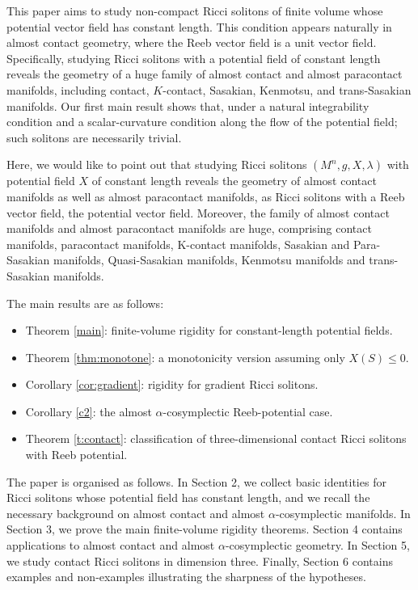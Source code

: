 \documentclass[a4paper, twoside, 10pt]{article}
\numberwithin{equation}{section}
\theoremstyle{definition}
\begin{document}
This paper aims to study non-compact Ricci solitons of finite volume whose potential vector field has constant length. This condition appears naturally in almost contact geometry, where the Reeb vector field is a unit vector field. Specifically, studying Ricci solitons with a potential field of constant length reveals the geometry of a huge family of almost contact and almost paracontact manifolds, including contact, $K$-contact, Sasakian, Kenmotsu, and trans-Sasakian manifolds. Our first main result shows that, under a natural integrability
condition and a scalar-curvature condition along the flow of the potential field; such solitons are necessarily trivial.

Here, we would like to point out that studying Ricci solitons $\left(
M^{n},g,X,\lambda \right) $ with potential field $X$ of constant length
reveals the geometry of almost contact manifolds as well as almost paracontact manifolds, as Ricci solitons with a Reeb vector field, the potential vector field. Moreover, the family of almost contact manifolds and
almost paracontact manifolds are huge, comprising contact manifolds,
paracontact manifolds, K-contact manifolds, Sasakian and Para-Sasakian
manifolds, Quasi-Sasakian manifolds, Kenmotsu manifolds and trans-Sasakian manifolds.

The main results are as follows:
\begin{itemize}
\item Theorem \ref{main}: finite-volume rigidity for constant-length potential fields.
\item Theorem \ref{thm:monotone}: a monotonicity version assuming only $X(S)\le0$.
\item Corollary \ref{cor:gradient}: rigidity for gradient Ricci solitons.
\item Corollary \ref{c2}: the almost $\alpha$-cosymplectic Reeb-potential case.
\item Theorem \ref{t:contact}: classification of three-dimensional contact Ricci solitons with Reeb potential.
\end{itemize}

The paper is organised as follows. In Section 2, we collect basic
identities for Ricci solitons whose potential field has constant
length, and we recall the necessary background on almost contact and
almost $\alpha$-cosymplectic manifolds. In Section 3, we prove the main
finite-volume rigidity theorems. Section 4 contains applications to
almost contact and almost $\alpha$-cosymplectic geometry. In Section 5,
we study contact Ricci solitons in dimension three. Finally, Section 6 contains examples and non-examples illustrating the sharpness of the hypotheses.
\end{document}
